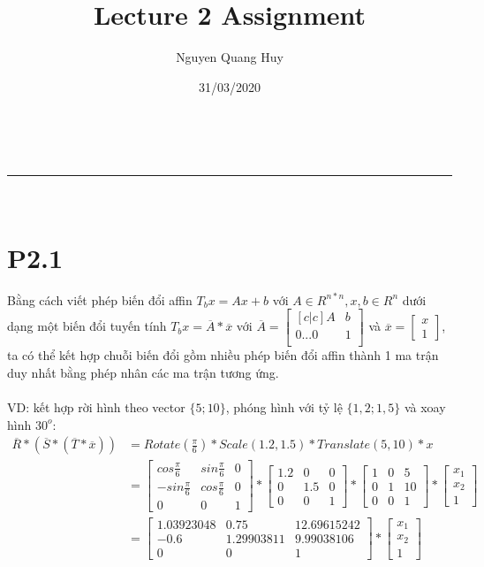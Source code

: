 \documentclass[a4paper,11pt]{article}
\makeatletter
\newcommand{\linia}{\rule{\linewidth}{0.5pt}}
\theoremstyle{mytheor}
\renewcommand{\maketitle}{
\begin{center}
\vspace{2ex}
{\huge \textsc{\@title}}
\vspace{1ex}
\\
\linia\\
\@author \hfill \@date
\vspace{4ex}
\end{center}
}
\makeatother
\begin{document}
\title{Lecture 2 Assignment}

\author{Nguyen Quang Huy}

\date{31/03/2020}

\maketitle

\section*{P2.1}

Bằng cách viết phép biến đổi affin $T_bx = Ax+b$ với $A \in R^{n*n},x,b\in R^n$ dưới dạng một biến đổi tuyến tính $T_bx = \overline{A}*\overline{x}$ với $\overline{A}= \begin{bmatrix}[c|c] A &  b \\0 ... 0  & 1\\ \end{bmatrix}$ và $\overline{x} = \begin{bmatrix}x\\1\end{bmatrix}$, ta có thể kết hợp chuỗi biến đổi gồm nhiều phép biến đổi affin thành 1 ma trận duy nhất bằng phép nhân các ma trận tương ứng.\\
\\
VD: kết hợp rời hình theo vector $\{5;10\}$, phóng hình với tỷ lệ $\{1,2;1,5\}$ và xoay hình $30^o$:
\begin{align}
    \nonumber \overline{R}*(\overline{S}*(\overline{T}*\overline{x}))  &= Rotate(\frac{\pi}{6}) * Scale(1.2,1.5) * Translate(5,10) * x \\
    \nonumber &= \begin{bmatrix} cos\frac{\pi}{6} & sin\frac{\pi}{6} & 0 \\ -sin\frac{\pi}{6} & cos\frac{\pi}{6} & 0 \\ 0 & 0 & 1\end{bmatrix} * 
        \begin{bmatrix} 1.2 & 0 & 0 \\ 0 & 1.5 & 0 \\ 0 & 0& 1\end{bmatrix} * 
        \begin{bmatrix} 1 & 0 & 5 \\ 0 & 1 & 10 \\ 0 & 0 & 1\end{bmatrix} *
        \begin{bmatrix} x_1 \\ x_2 \\ 1 \end{bmatrix}
        \\
    \nonumber &= \begin{bmatrix} 1.03923048 & 0.75 & 12.69615242 \\ -0.6 & 1.29903811 & 9.99038106 \\ 0 & 0& 1 \end{bmatrix} * \begin{bmatrix} x_1 \\ x_2 \\ 1 \end{bmatrix}
\end{align}
\end{document}
